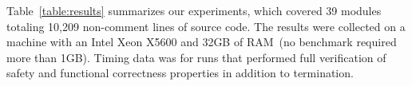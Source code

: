 


Table~\ref{table:results} summarizes our experiments, which 
covered 39 modules totaling 10,209 non-comment lines of 
source code. %
%
The results were collected on a machine with an Intel Xeon 
X5600 and 32GB of RAM~(no benchmark required more than 1GB).
%
Timing data was for runs that performed full
verification of safety and functional correctness 
properties in addition to termination. %


